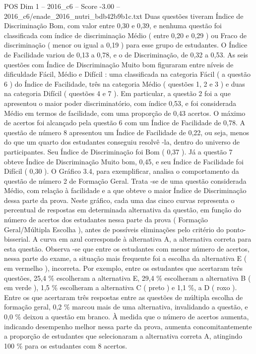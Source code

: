 \begin{textsample}{POS Dim 1 – 2016\_c6 – Score -3.00 – 2016\_c6/enade\_2016\_nutri\_bdb42b9b1c.txt}
Duas questões tiveram Índice de Discriminação Bom, com valor entre 0,30 e 0,39, e nenhuma questão foi classificada com índice de discriminação Médio ( entre 0,20 e 0,29 ) ou Fraco de discriminação ( menor ou igual a 0,19 ) para esse grupo de estudantes.
O Índice de Facilidade variou de 0,13 a 0,78, e o de Discriminação, de 0,32 a 0,53.
As seis questões com Índice de Discriminação Muito bom figuraram entre níveis de dificuldade Fácil, Médio e Difícil : uma classificada na categoria Fácil ( a questão 6 ) do Índice de Facilidade, três na categoria Médio ( questões 1, 2 e 3 ) e duas na categoria Difícil ( questões 4 e 7 ).
Em particular, a questão 2 foi a que apresentou o maior poder discriminatório, com índice 0,53, e foi considerada Médio em termos de facilidade, com uma proporção de 0,43 acertos.
O máximo de acertos foi alcançado pela questão 6 com um Índice de Facilidade de 0,78.
A questão de número 8 apresentou um Índice de Facilidade de 0,22, ou seja, menos do que um quarto dos estudantes conseguiu resolvê -la, dentro do universo de participantes.
Seu Índice de Discriminação foi Bom ( 0,37 ).
Já a questão 7 obteve Índice de Discriminação Muito bom, 0,45, e seu Índice de Facilidade foi Difícil ( 0,30 ).
O Gráfico 3.4, para exemplificar, analisa o comportamento da questão de número 2 de Formação Geral.
Trata -se de uma questão considerada Médio, com relação à facilidade e a que obteve o maior Índice de Discriminação dessa parte da prova.
Neste gráfico, cada uma das cinco curvas representa o percentual de respostas em determinada alternativa da questão, em função do número de acertos dos estudantes nessa parte da prova ( Formação Geral/Múltipla Escolha ), antes de possíveis eliminações pelo critério do ponto-bisserial.
A curva em azul corresponde à alternativa A, a alternativa correta para esta questão.
Observa -se que entre os estudantes com menor número de acertos, nessa parte do exame, a situação mais frequente foi a escolha da alternativa E ( em vermelho ), incorreta.
Por exemplo, entre os estudantes que acertaram três questões, 25,4 \% escolheram a alternativa E, 29,4 \% escolheram a alternativa B ( em verde ), 1,5 \% escolheram a alternativa C ( preto ) e 1,1 \%, a D ( roxo ).
Entre os que acertaram três respostas entre as questões de múltipla escolha de formação geral, 0,2 \% marcou mais de uma alternativa, invalidando a questão, e 0,0 \% deixou a questão em branco.
À medida que o número de acertos aumenta, indicando desempenho melhor nessa parte da prova, aumenta concomitantemente a proporção de estudantes que selecionaram a alternativa correta A, atingindo 100 \% para os estudantes com 8 acertos.

\end{textsample}
